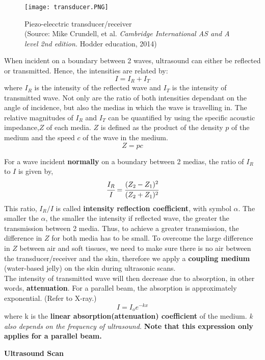 \documentclass{article}
\begin{document}
\begin{figure}[H]
    \centering
    \captionsetup{justification=centering,margin=2cm}
    \texttt{[image: transducer.PNG]}
    \caption*{Piezo-elecctric transducer/receiver \\(Source: Mike Crundell, et al. \textit{Cambridge International AS and A level 2nd edition.} Hodder education, 2014)}
    \label{fig:my_label}
\end{figure}

When incident on a boundary between 2 waves, ultrasound can either be reflected or transmitted. Hence, the intensities are related by:
$$I=I_R+I_T$$
where $I_R$ is the intensity of the reflected wave and $I_T$ is the intensity of transmitted wave. Not only are the ratio of both intensities dependant on the angle of incidence, but also the medias in which the wave is travelling in. The relative magnitudes of $I_R$ and $I_T$ can be quantified by using the specific acoustic impedance,$Z$ of each media. $Z$ is defined as the product of the density $p$ of the medium and the speed $c$ of the wave in the medium. 
$$Z=pc$$

For a wave incident \textbf{normally} on a boundary between 2 medias, the ratio of $I_R$ to $I$ is given by,
$$\cfrac{I_R}{I}=\cfrac{(Z_2-Z_1)^2}{(Z_2+Z_1)^2}$$
This ratio, $I_R/I$ is called \textbf{intensity reflection coefficient}, with symbol $\alpha$. The smaller the $\alpha$, the smaller the intensity if reflected wave, the greater the transmission between 2 media. Thus, to achieve a greater transmission, the difference in $Z$ for both media has to be small. To overcome the large difference in $Z$ between air and soft tissues, we need to make sure there is no air between the transducer/receiver and the skin, therefore we apply a \textbf{coupling medium }(water-based jelly) on the skin during ultrasonic scans.
\\The intensity of transmitted wave will then decrease due to absorption, in other words, \textbf{attenuation}. For a parallel beam, the absorption is approximately exponential. (Refer to X-ray.)
$$I=I_oe^{-kx}$$
where k is the \textbf{linear absorption(attenuation) coefficient} of the medium. \textit{k also depends on the frequency of ultrasound.} \textbf{Note that this expression only applies for a parallel beam.}

\begin{flushleft}
\textbf{Ultrasound Scan}
\end{flushleft}
\end{document}
